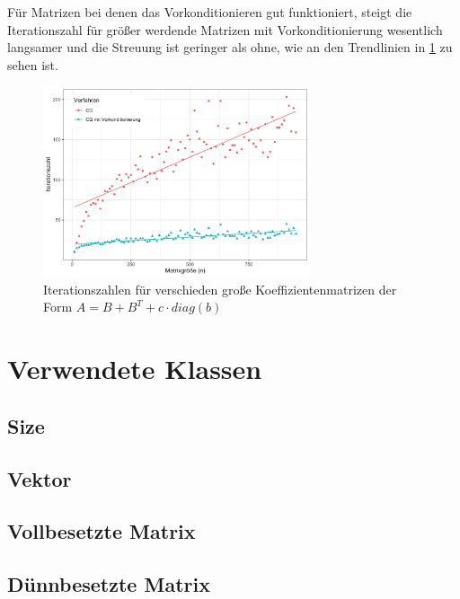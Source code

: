 \documentclass[12pt,a4paper]{scrartcl}
\numberwithin{equation}{section}
\numberwithin{myalgctr}{section}
\numberwithin{mytheoremctr}{subsection}
\numberwithin{mykorollarctr}{subsection}
\numberwithin{mylemmactr}{subsection}
\numberwithin{mybeispielctr}{subsection}
\begin{document}
	F\"ur Matrizen bei denen das Vorkonditionieren gut funktioniert, steigt die Iterationszahl f\"ur gr\"o\ss er werdende Matrizen mit Vorkonditionierung wesentlich langsamer und die Streuung ist geringer als ohne, wie an den Trendlinien in \cref{fig:precond-vs-cg-it} zu sehen ist. 
	
	\begin{figure}[H]
		\begin{center}
			\includegraphics[width=0.7\textwidth]{../plots/precond-vs-cg-it.png}
		\end{center}
		\caption{Iterationszahlen f\"ur verschieden gro\ss e Koeffizientenmatrizen der Form $A = B+B^T+c\cdot diag(b)$}
		\label{fig:precond-vs-cg-it}	
	\end{figure}
	
	
	
	\newpage
	\appendix
	\section{Verwendete Klassen}
	\subsection{Size}
	
	\subsection{Vektor}
	
	\subsection{Vollbesetzte Matrix}
	
	\subsection{D\"unnbesetzte Matrix}
	
	
	\newpage
	\printbibliography
	\lstlistoflistings
	\listoffigures
	\thispagestyle{firststyle}
	
\end{document}
